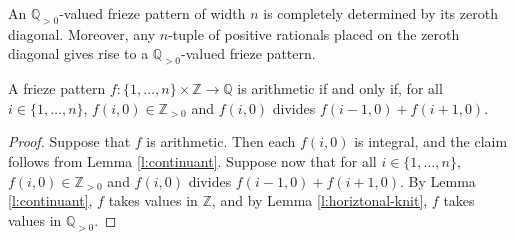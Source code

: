     \begin{lemma}
        \label{l:horiztonal-knit}
        An $\mathbb{Q}_{>0}$-valued frieze pattern of width $n$ is completely determined by its
        zeroth diagonal. Moreover, any $n$-tuple of positive rationals placed on the zeroth diagonal 
        gives rise to a $\mathbb{Q}_{>0}$-valued frieze pattern.
    \end{lemma}
    
    \begin{lemma}
        \label{l:lower-bound-crit}
        A frieze pattern $f : \{1,\ldots, n\} \times \mathbb{Z} \to \mathbb{Q}$ is arithmetic if and only if, 
        for all $i \in \{1, \ldots , n\}$, $f(i,0) \in \mathbb{Z}_{>0}$ and $f(i,0)$ divides $f(i-1,0) + f(i+1,0)$.
    \end{lemma}
    \begin{proof}
        Suppose that $f$ is arithmetic. Then each $f(i,0)$ is integral, and the claim follows from Lemma \ref{l:continuant}. 
        Suppose now that for all $i \in \{1, \ldots , n\}$, $f(i,0) \in \mathbb{Z}_{>0}$ and $f(i,0)$ divides $f(i-1,0) + f(i+1,0)$. By 
        Lemma \ref{l:continuant}, $f$ takes values in $\mathbb{Z}$, and by Lemma \ref{l:horiztonal-knit}, $f$ takes values in $\mathbb{Q}_{>0}$. 
    \end{proof}

\fi
